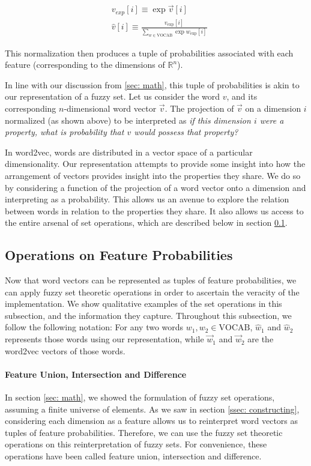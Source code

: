 \documentclass{book}
\begin{document}
{\footnotesize \begin{align*} & v_{exp}[i] \equiv \exp \vec v[i] \\ & \hat v[i]
\equiv \frac{v_{\text{exp}}[i]}{\sum_{w \in \text{VOCAB}} \exp
w_{\text{exp}}[i]} \end{align*} }

This normalization then produces a tuple of probabilities associated with each
feature (corresponding to the dimensions of $\mathbb{R}^n$). 

In line with our discussion from \ref{sec: math}, this tuple of probabilities
is akin to our representation of a fuzzy set. Let us consider the word $v$, and
its corresponding $n$-dimensional word vector $\vec v$. The projection of $\vec
v$ on a dimension $i$ normalized (as shown above) to be interpreted as
\textit{if this dimension $i$ were a property, what is probability that $v$
would possess that property?} 

In word2vec, words are distributed in a vector space of a particular
dimensionality. Our representation attempts to provide some insight into how
the arrangement of vectors provides insight into the properties they share. We
do so by considering a function of the projection of a word vector onto a
dimension and interpreting as a probability. This allows us an avenue to
explore the relation between words in relation to the properties they share. It
also allows us access to the entire arsenal of set operations, which are
described below in section \ref{ssec: set operations}.

\subsection{Operations on Feature Probabilities} \label{ssec: set operations}

Now that word vectors can be represented as tuples of feature probabilities, we
can apply fuzzy set theoretic operations in order to ascertain the veracity of
the implementation. We show qualitative examples of the set operations in this
subsection, and the information they capture. Throughout this subsection, we
follow the following notation: For any two words $w_1, w_2 \in \text{VOCAB}$,
$\hat w_1$ and $\hat w_2$ represents those words using our representation,
while $\vec w_1$ and $\vec w_2$ are the word2vec vectors of those words.

\paragraph{Feature Union, Intersection and Difference} In section \ref{sec:
math}, we showed the formulation of fuzzy set operations, assuming a finite
universe of elements. As we saw in section \ref{ssec: constructing},
considering each dimension as a feature allows us to reinterpret word vectors
as tuples of feature probabilities. Therefore, we can use the fuzzy set
theoretic operations on this reinterpretation of fuzzy sets. For convenience,
these operations have been called feature union, intersection and difference. 
\end{document}
